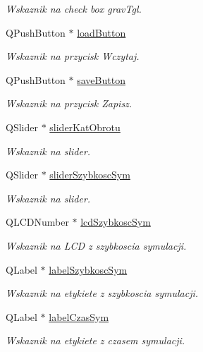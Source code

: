 \begin{DoxyCompactItemize}
\begin{DoxyCompactList}\small\item\em Wskaznik na check box grav\-Tgl. \end{DoxyCompactList}\item 
Q\-Push\-Button $\ast$ \hyperlink{class_okno_glowne_accbadc3bc4d418cfe1bce2be61881917}{load\-Button}
\begin{DoxyCompactList}\small\item\em Wskaznik na przycisk Wczytaj. \end{DoxyCompactList}\item 
Q\-Push\-Button $\ast$ \hyperlink{class_okno_glowne_a81e6650fa592f04bf0adc3bebd3346d6}{save\-Button}
\begin{DoxyCompactList}\small\item\em Wskaznik na przycisk Zapisz. \end{DoxyCompactList}\item 
Q\-Slider $\ast$ \hyperlink{class_okno_glowne_aaee43ea7074cff126b069c60657d698d}{slider\-Kat\-Obrotu}
\begin{DoxyCompactList}\small\item\em Wskaznik na slider. \end{DoxyCompactList}\item 
Q\-Slider $\ast$ \hyperlink{class_okno_glowne_a85328893065393400d5a0344004ca78b}{slider\-Szybkosc\-Sym}
\begin{DoxyCompactList}\small\item\em Wskaznik na slider. \end{DoxyCompactList}\item 
Q\-L\-C\-D\-Number $\ast$ \hyperlink{class_okno_glowne_ab100c00d4ba33d896fd0985ac366296a}{lcd\-Szybkosc\-Sym}
\begin{DoxyCompactList}\small\item\em Wskaznik na L\-C\-D z szybkoscia symulacji. \end{DoxyCompactList}\item 
Q\-Label $\ast$ \hyperlink{class_okno_glowne_ad7b0708ffdf61f3bef1349cc353a6c4e}{label\-Szybkosc\-Sym}
\begin{DoxyCompactList}\small\item\em Wskaznik na etykiete z szybkoscia symulacji. \end{DoxyCompactList}\item 
Q\-Label $\ast$ \hyperlink{class_okno_glowne_aca07e1dc5cbe30d6952f9b952073bb79}{label\-Czas\-Sym}
\begin{DoxyCompactList}\small\item\em Wskaznik na etykiete z czasem symulacji. \end{DoxyCompactList}\item 

\end{DoxyCompactItemize}
